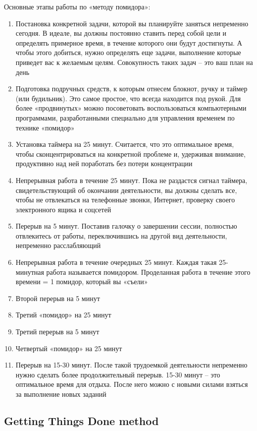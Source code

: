 \documentclass{../industrial-development}
\begin{document}
Основные этапы работы по «методу помидора»:
\begin{enumerate}
  \item Постановка конкретной задачи, которой вы планируйте заняться непременно сегодня. В идеале, вы должны постоянно ставить перед собой цели и определять примерное время, в течение которого они будут достигнуты. А чтобы этого добиться, нужно определять еще задачи,  выполнение которые приведет вас к желаемым целям.  Совокупность таких задач – это ваш план на день
  \item Подготовка подручных средств, к которым отнесем блокнот, ручку и таймер (или будильник). Это самое простое, что всегда находится под рукой. Для более «продвинутых» можно посоветовать воспользоваться компьютерными программами, разработанными специально для управления временем по технике «помидор»
  \item Установка таймера на 25 минут. Считается, что это оптимальное время, чтобы сконцентрироваться на конкретной проблеме и, удерживая внимание, продуктивно над ней поработать без потери концентрации
  \item Непрерывная работа в течение 25 минут. Пока не раздастся сигнал таймера, свидетельствующий об окончании деятельности, вы должны сделать все, чтобы не отвлекаться на телефонные звонки, Интернет, проверку своего электронного ящика и соцсетей
  \item Перерыв на 5 минут. Поставив галочку о завершении сессии, полностью отвлекитесь от работы, переключившись на другой вид деятельности, непременно расслабляющий
  \item Непрерывная работа в течение очередных 25 минут. Каждая такая 25-минутная работа называется помидором. Проделанная работа в течение этого времени = 1 помидор, который вы «съели»
  \item Второй перерыв на 5 минут
  \item Третий «помидор» на 25 минут
  \item Третий перерыв на 5 минут
  \item Четвертый «помидор» на 25 минут
  \item Перерыв на 15-30 минут. После такой трудоемкой деятельности непременно нужно сделать более продолжительный перерыв. 15-30 минут – это оптимальное время для отдыха. После него можно с новыми силами взяться за выполнение новых заданий~\cite{Pomidoro}
\end{enumerate}

\subsection{Getting Things Done method}
\end{document}
